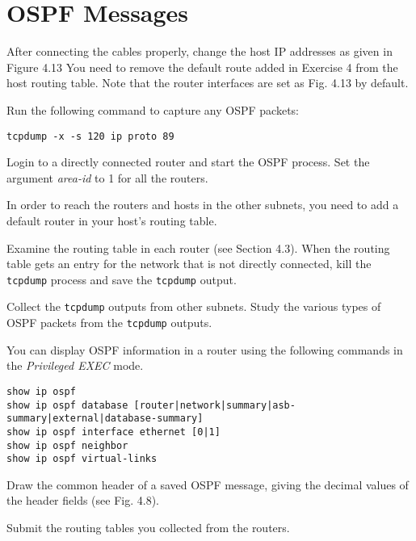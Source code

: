 \documentclass{../UTNetLab}
\begin{document}
\section{OSPF Messages}
    After connecting the cables properly, change the host IP addresses as given in Figure 4.13 You need to remove the default route added in Exercise 4 from the host routing table.
    Note that the router interfaces are set as Fig. 4.13 by default. 

    Run the following command to capture any OSPF packets: 
    \begin{lstlisting}
tcpdump -x -s 120 ip proto 89
    \end{lstlisting}

    Login to a directly connected router and start the OSPF process.
    Set the argument \textit{area-id} to 1 for all the routers. 

    In order to reach the routers and hosts in the other subnets, you need to add a default router in your host’s routing table. 

    Examine the routing table in each router (see Section 4.3).
    When the routing table gets an entry for the network that is not directly connected, kill the \lstinline{tcpdump} process and save the \lstinline{tcpdump} output. 

    Collect the \lstinline{tcpdump} outputs from other subnets.
    Study the various types of OSPF packets from the \lstinline{tcpdump} outputs. 

    You can display OSPF information in a router using the following commands in the \textit{Privileged EXEC} mode.
    \begin{lstlisting}[language={cisco}]
show ip ospf
show ip ospf database [router|network|summary|asb-summary|external|database-summary]
show ip ospf interface ethernet [0|1]
show ip ospf neighbor
show ip ospf virtual-links
    \end{lstlisting}
    
    \begin{report}
        \item Draw the common header of a saved OSPF message, giving the decimal values of the header fields (see Fig. 4.8).
        
        \item Submit the routing tables you collected from the routers.
    \end{report}
\end{document}
